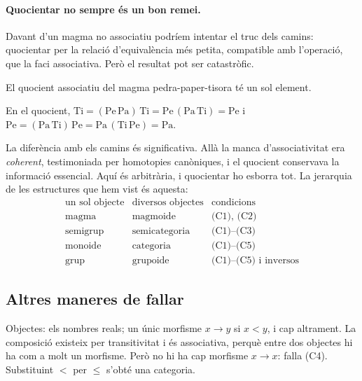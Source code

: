 \paragraph{Quocientar no sempre és un bon remei.} Davant d'un magma no associatiu podríem intentar el truc dels camins: quocientar per la relació d'equivalència més petita, compatible amb l'operació, que la faci associativa. Però el resultat pot ser catastròfic.

\begin{proposicio}
El quocient associatiu del magma pedra-paper-tisora té un sol element.
\end{proposicio}

\begin{prova}
En el quocient, $\mathrm{Ti}=(\mathrm{Pe}\,\mathrm{Pa})\,\mathrm{Ti}=\mathrm{Pe}\,(\mathrm{Pa}\,\mathrm{Ti})=\mathrm{Pe}$ i $\mathrm{Pe}=(\mathrm{Pa}\,\mathrm{Ti})\,\mathrm{Pe}=\mathrm{Pa}\,(\mathrm{Ti}\,\mathrm{Pe})=\mathrm{Pa}$.
\end{prova}

La diferència amb els camins és significativa. Allà la manca d'associativitat era \emph{coherent}, testimoniada per homotopies canòniques, i el quocient conservava la informació essencial. Aquí és arbitrària, i quocientar ho esborra tot. La jerarquia de les estructures que hem vist és aquesta:
\[
\renewcommand{\arraystretch}{1.2}
\begin{array}{lll}
\text{un sol objecte} & \text{diversos objectes} & \text{condicions}\\\hline
\text{magma} & \text{magmoide} & \text{(C1), (C2)}\\
\text{semigrup} & \text{semicategoria} & \text{(C1)--(C3)}\\
\text{monoide} & \text{categoria} & \text{(C1)--(C5)}\\
\text{grup} & \text{grupoide} & \text{(C1)--(C5) i inversos}
\end{array}
\]

\subsection{Altres maneres de fallar}

\begin{exemple}
Objectes: els nombres reals; un únic morfisme $x\to y$ si $x<y$, i cap altrament. La composició existeix per transitivitat i és associativa, perquè entre dos objectes hi ha com a molt un morfisme. Però no hi ha cap morfisme $x\to x$: falla (C4). Substituint $<$ per $\le$ s'obté una categoria.
\end{exemple}

